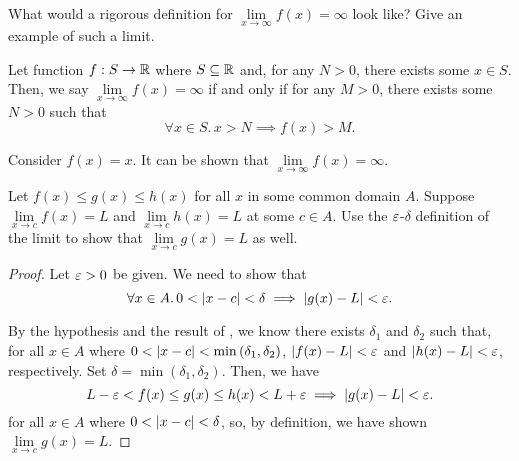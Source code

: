 \begin{problem}
  What would a rigorous definition for 
  $\lim\limits_{x \to \infty} f(x) = \infty$ look like? 
  Give an example of such a limit.

  \begin{definition}
    \label{def:limit-to-infty-x-to-infinite}
    Let function $f : S \to \mathbb{R}$ where $S \subseteq \mathbb{R}$ and, for any $N > 0$, there 
    exists some $x \in S$.
    Then, we say $\lim\limits_{x \to \infty} f(x) = \infty$ if and only if for any
    $M > 0$, there exists some $N > 0$ such that
    \[
      \forall x \in S.\, x > N \implies f(x) > M.
    \]
  \end{definition}

  Consider $f(x) = x$. It can be shown that $\lim\limits_{x \to \infty} f(x) = \infty$.

\end{problem}

\begin{problem}
  \label{prob:squeeze-theorem}
  Let $f(x) \leq g(x) \leq h(x)$ for all $x$ in some common domain $A$. Suppose $\lim\limits_{x \to c} f(x) = L$ and
  $\lim\limits_{x \to c} h(x) = L$ at some $c \in A$. Use the $\varepsilon$-$\delta$  definition of the limit
  to show  that $\lim\limits_{x \to c} g(x) = L$ as well.

  \begin{proof}
    Let $\varepsilon > 0$ be given. We need to show that
    \[
      \forall x \in A.\, 0 < \left\lvert x - c \right\rvert < \delta \implies \left\lvert g(x) - L \right\rvert < \varepsilon.
    \]

    By the hypothesis and the result of , we know there exists
    $\delta_{1}$ and $\delta_{2}$ such that, for all $x \in A$ where $0 < \left\lvert x - c \right\rvert < \min{(\delta_{1}, \delta_{2})}$,
    $\left\lvert f(x) - L \right\rvert < \varepsilon$ and $\left\lvert h(x) - L \right\rvert < \varepsilon$, respectively. Set $\delta = \min{(\delta_{1}, \delta_{2})}$. 
    Then, we have
    \[
      L - \varepsilon < f(x) \leq g(x) \leq h(x) < L + \varepsilon \implies \left\lvert g(x) - L \right\rvert < \varepsilon.
    \]
    for all $x \in A$ where $0 < \left\lvert x - c \right\rvert < \delta$, so, by definition, we have 
    shown $\lim\limits_{x \to c} g(x) = L$.
  \end{proof}
  
\end{problem}
